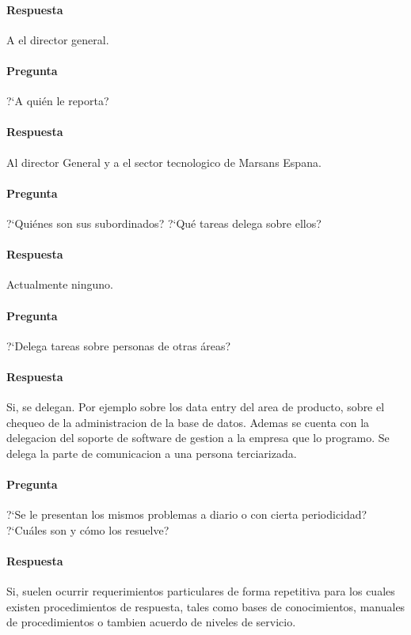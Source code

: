 \documentclass[12pt,a4paper,spanish]{article}
\begin{document}
	\paragraph{Respuesta}
A el director general.
	\paragraph{Pregunta}
	 ?`A qui\'en le reporta?
	\paragraph{Respuesta}
Al director General y a el sector tecnologico de Marsans Espana.
	\paragraph{Pregunta}
	 ?`Qui\'enes son sus subordinados?  ?`Qu\'e tareas delega sobre ellos?
	\paragraph{Respuesta}
Actualmente ninguno.

	\paragraph{Pregunta}
	 ?`Delega tareas sobre personas de otras \'areas?
	\paragraph{Respuesta}
Si, se delegan. Por ejemplo sobre los data entry del area de producto, sobre el chequeo de la administracion de la base de datos.
Ademas se cuenta con la delegacion del soporte de software de gestion a la empresa que lo programo.
Se delega la parte de comunicacion a una persona terciarizada.

	\paragraph{Pregunta}
	 ?`Se le presentan los mismos problemas a diario o con cierta periodicidad?  ?`Cu\'ales son y c\'omo los resuelve?
	\paragraph{Respuesta}
Si, suelen ocurrir requerimientos particulares de forma repetitiva para los cuales existen procedimientos de respuesta, tales como bases de conocimientos, manuales de procedimientos o tambien acuerdo de niveles de servicio.
\end{document}
